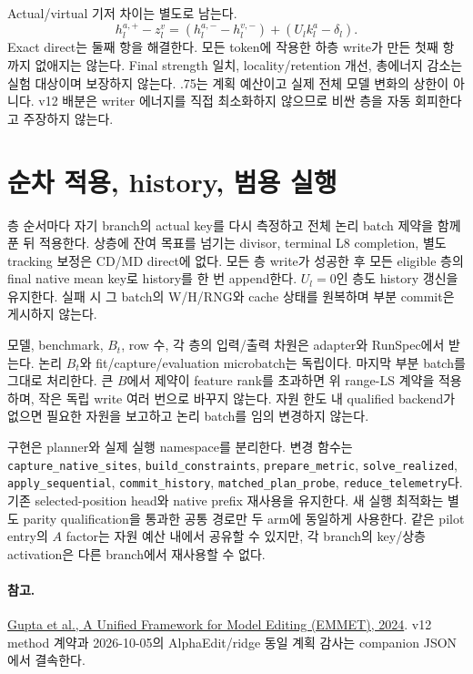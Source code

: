 \documentclass[11pt]{article}
\begin{document}
Actual/virtual 기저 차이는 별도로 남는다.
\[
 h_l^{a,+}-z_l^v
 =(h_l^{a,-}-h_l^{v,-})+(U_lk_l^a-\delta_l).
\]
Exact direct는 둘째 항을 해결한다. 모든 token에 작용한 하층 write가 만든
첫째 항까지 없애지는 않는다. Final strength 일치, locality/retention 개선,
총에너지 감소는 실험 대상이며 보장하지 않는다. .75는 계획 예산이고 실제
전체 모델 변화의 상한이 아니다. v12 배분은 writer 에너지를 직접 최소화하지 않으므로
비싼 층을 자동 회피한다고 주장하지 않는다.

\section{순차 적용, history, 범용 실행}
층 순서마다 자기 branch의 actual key를 다시 측정하고 전체 논리 batch 제약을
함께 푼 뒤 적용한다. 상층에 잔여 목표를 넘기는 divisor, terminal L8 completion,
별도 tracking 보정은 CD/MD direct에 없다.
모든 층 write가 성공한 후 모든 eligible 층의 final native mean key로
history를 한 번 append한다. $U_l=0$인 층도 history 갱신을 유지한다.
실패 시 그 batch의 W/H/RNG와 cache 상태를 원복하며 부분 commit은 게시하지 않는다.

모델, benchmark, $B_t$, row 수, 각 층의 입력/출력 차원은 adapter와 RunSpec에서
받는다. 논리 $B_t$와 fit/capture/evaluation microbatch는 독립이다. 마지막 부분
batch를 그대로 처리한다. 큰 $B$에서 제약이 feature rank를 초과하면 위 range-LS
계약을 적용하며, 작은 독립 write 여러 번으로 바꾸지 않는다. 자원 한도 내 qualified
backend가 없으면 필요한 자원을 보고하고 논리 batch를 임의 변경하지 않는다.

구현은 planner와 실제 실행 namespace를 분리한다. 변경 함수는
\texttt{capture\_native\_sites}, \texttt{build\_constraints},
\texttt{prepare\_metric}, \texttt{solve\_realized},
\texttt{apply\_sequential}, \texttt{commit\_history},
\texttt{matched\_plan\_probe}, \texttt{reduce\_telemetry}다.
기존 selected-position head와 native prefix 재사용을 유지한다. 새 실행 최적화는
별도 parity qualification을 통과한 공통 경로만 두 arm에 동일하게 사용한다.
같은 pilot entry의 $A$ factor는 자원 예산 내에서 공유할 수 있지만, 각 branch의
key/상층 activation은 다른 branch에서 재사용할 수 없다.

\paragraph{참고.}
\href{https://aclanthology.org/2024.findings-emnlp.903/}{Gupta et al., A Unified Framework for Model Editing (EMMET), 2024}.
v12 method 계약과 2026-10-05의 AlphaEdit/ridge 동일 계획 감사는 companion JSON에서 결속한다.
\end{document}
